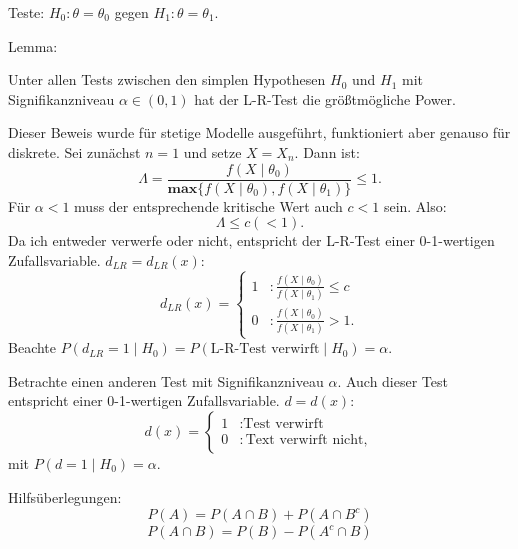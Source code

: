 \documentclass[10pt]{article}
\newcommand{\eqname}[1]{\tag*{#1}}%
\newcommand{\dlr}{d_{LR}}%
\newenvironment{BWS}[1][]
{\begin{Beweis}[frametitle=#1]}{\end{Beweis}}
\begin{document}
	Teste: $H_0: \theta = \theta_0$ gegen $H_1: \theta = \theta_1.$
	
	Lemma:
	
	Unter allen Tests zwischen den simplen Hypothesen $H_0$ und $H_1$ mit Signifikanzniveau $\alpha \in (0,1)$ hat der L-R-Test die größtmögliche Power. 
	
	\begin{BWS}[Beweis (NP-Lemma)]
		Dieser Beweis wurde für stetige Modelle ausgeführt, funktioniert aber genauso für diskrete. 
		Sei zunächst $n=1$ und setze $X = X_n$. 
		Dann ist:
		\begin{equation*}
			\Lambda = \frac{f(X\mid \theta_0)}{\textbf{max}\{f(X\mid \theta_0), f(X \mid \theta_1)\}} \leq 1.
		\end{equation*}
		Für $\alpha < 1$ muss der entsprechende kritische Wert auch $c < 1$ sein. Also:
		\begin{equation*}
			\Lambda \leq c (< 1).
		\end{equation*}
		Da ich entweder verwerfe oder nicht, entspricht der L-R-Test einer 0-1-wertigen Zufallsvariable. $d_{LR} = d_{LR}(x)$:
		\begin{equation*}
			\dlr(x) = \begin{cases}
				1 &: \frac{f(X\mid \theta_0)}{f(X\mid \theta_1)} \leq c\\
				0 &: \frac{f(X\mid \theta_0)}{f(X\mid \theta_1)} > 1.
			\end{cases}
		\end{equation*}
		Beachte $P(\dlr=1 \mid H_0) = P(\text{L-R-Test verwirft}\mid H_0) = \alpha$.
		
		Betrachte einen anderen Test mit Signifikanzniveau $\alpha$. Auch dieser Test entspricht einer 0-1-wertigen Zufallsvariable. $d = d(x)$:
		\begin{equation*}
			d(x)= \begin{cases}
				1 &: \text{Test verwirft}\\
				0 &: \text{Text verwirft nicht},
			\end{cases}
		\end{equation*}
		mit $P(d=1\mid H_0) = \alpha$.
		
		Hilfsüberlegungen:
		\begin{equation*}
			P(A) = P(A \cap B) + P(A \cap B^c) \eqname{(1)}
		\end{equation*}
		\begin{equation*}
			P(A \cap B) = P(B) - P(A^c \cap B) \eqname{(2)}
		\end{equation*}
		

\end{BWS}
\end{document}
